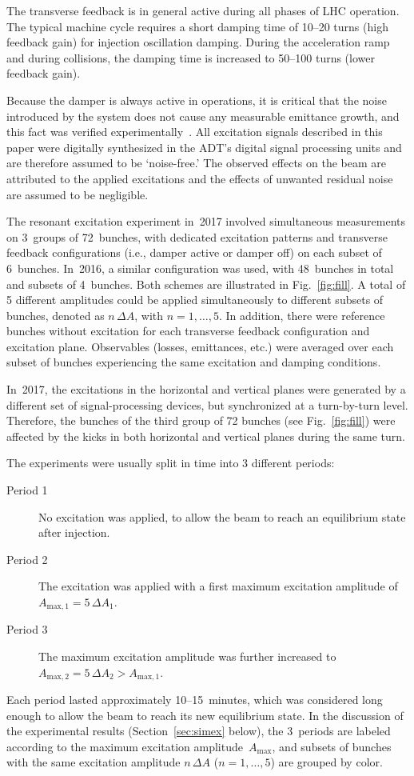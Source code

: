 \documentclass[%
 reprint,
 amsmath,amssymb,
 aps,
prstab,
longbibliography
]{revtex4-1}
\begin{document}
The transverse feedback is in general active during all phases of LHC
operation. The typical machine cycle requires a short damping time of
10--20 turns (high feedback gain) for injection oscillation
damping. During the acceleration ramp and during collisions, the
damping time is increased to 50--100 turns (lower feedback gain).

Because the damper is always active in operations, it is critical that
the noise introduced by the system does not cause any measurable
emittance growth, and this fact was verified
experimentally~\cite{adt_noise_emit_2017}. All excitation signals
described in this paper were digitally synthesized in the ADT's
digital signal processing units and are therefore assumed to be
`noise-free.' The observed effects on the beam are attributed to the
applied excitations and the effects of unwanted residual noise are
assumed to be negligible.

The resonant excitation experiment in~2017 involved simultaneous
measurements on 3~groups of 72~bunches, with dedicated excitation
patterns and transverse feedback configurations (i.e., damper active
or damper off) on each subset of 6~bunches. In~2016, a similar
configuration was used, with 48~bunches in total and subsets of
4~bunches. Both schemes are illustrated in Fig.~\ref{fig:fill}. A
total of 5 different amplitudes could be applied simultaneously to
different subsets of bunches, denoted as $n \, \Delta A$, with
$n = 1, \ldots, 5$. In addition, there were reference bunches without
excitation for each transverse feedback configuration and excitation
plane. Observables (losses, emittances, etc.) were averaged over each
subset of bunches experiencing the same excitation and damping
conditions.

In~2017, the excitations in the horizontal and vertical planes were
generated by a different set of signal-processing devices, but
synchronized at a turn-by-turn level. Therefore, the bunches of the
third group of 72 bunches (see Fig.~\ref{fig:fill}) were affected by
the kicks in both horizontal and vertical planes during the same turn.

The experiments were usually split in time into 3 different periods:
%
\begin{description}
\item[Period 1] No excitation was applied, to allow the beam to reach
  an equilibrium state after injection.
\item[Period 2] The excitation was applied with a first maximum
  excitation amplitude of $A_{\mathrm{max,1}} = 5 \, \Delta A_1$.
\item[Period 3] The maximum excitation amplitude was further increased
  to $A_{\mathrm{max,2}} = 5 \, \Delta A_2 > A_{\mathrm{max,1}}$.
\end{description}
%
Each period lasted approximately 10--15~minutes, which was considered
long enough to allow the beam to reach its new equilibrium state. In
the discussion of the experimental results (Section~\ref{sec:simex}
below), the 3~periods are labeled according to the maximum excitation
amplitude~$A_\mathrm{max}$, and subsets of bunches with the same
excitation amplitude $n \, \Delta A$ ($n = 1, \ldots, 5$) are grouped
by color.
\end{document}
